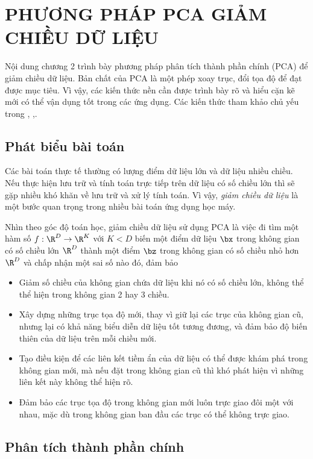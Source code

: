 \setcounter{chapter}{1}
\setcounter{section}{1}
\chapter{PHƯƠNG PHÁP PCA GIẢM CHIỀU DỮ LIỆU }
Nội dung chương 2 trình bày phương pháp phân tích thành phần chính (PCA) để giảm chiều dữ liệu. Bản chất của PCA là một phép xoay trục, đổi tọa độ để đạt được mục tiêu. Vì vậy, các kiến thức nền cần được trình bày rõ và hiểu cặn kẽ mới có thể vận dụng tốt trong các ứng dụng. Các kiến thức tham khảo chủ yếu trong \cite{1}, \cite{2},\cite{3}.
\section{Phát biểu bài toán}
Các bài toán thực tế thường có lượng điểm dữ liệu lớn và dữ liệu nhiều chiều. Nếu thực hiện lưu trữ và tính toán trực tiếp trên dữ liệu có số chiều lớn thì sẽ gặp nhiều khó khăn về lưu trữ và xử lý tính toán. Vì vậy, \textit{giảm chiều dữ liệu} là một bước quan trọng trong nhiều bài toán ứng dụng học máy.

Nhìn theo góc độ toán học, giảm chiều dữ liệu sử dụng PCA là việc đi tìm một hàm số $f: \R^D \rightarrow \R^K$ với $K < D$ biến một điểm dữ liệu $\bx$ trong không gian có số chiều lớn $\R^D$ thành một điểm $\bz$ trong không gian có số chiều nhỏ hơn $\R^D$ và chấp nhận một sai số nào đó, đảm bảo
\begin{itemize}
	\item Giảm số chiều của không gian chứa dữ liệu khi nó có số chiều lớn, không thể thể hiện trong không gian 2 hay 3 chiều.
	\item Xây dựng những trục tọa độ mới, thay vì giữ lại các trục của không gian cũ, nhưng lại có khả năng biểu diễn dữ liệu tốt tương đương, và đảm bảo độ biến thiên của dữ liệu trên mỗi chiều mới.
	\item Tạo điều kiện để các liên kết tiềm ẩn của dữ liệu có thể được khám phá trong không gian mới, mà nếu đặt trong không gian cũ thì khó phát hiện vì những liên kết này không thể hiện rõ.
	\item Đảm bảo các trục tọa độ trong không gian mới luôn trực giao đôi một với nhau, mặc dù trong không gian ban đầu các trục có thể không trực giao.
\end{itemize}
\section{Phân tích thành phần chính}
